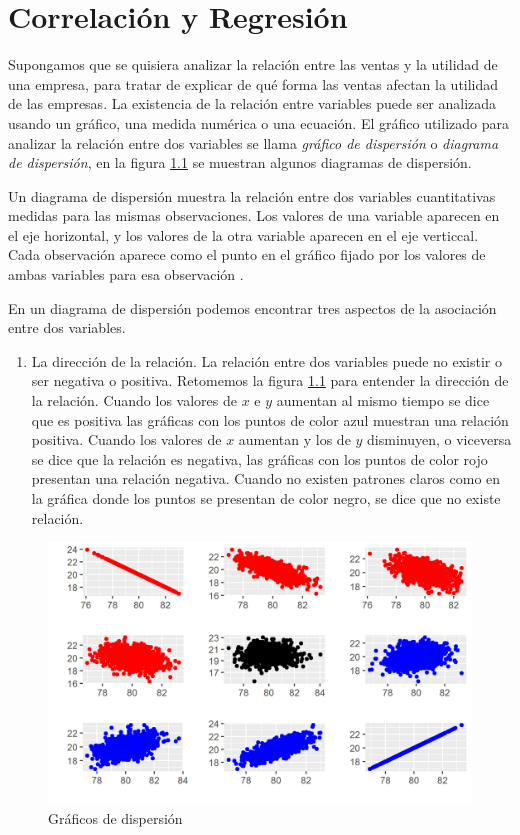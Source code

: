 \documentclass[letterpaper,]{book}
\providecommand{\tightlist}{%
  \setlength{\itemsep}{0pt}\setlength{\parskip}{0pt}}
\begin{document}
\hypertarget{methods}{%
\chapter{Correlación y Regresión}\label{methods}}

Supongamos que se quisiera analizar la relación entre las ventas y la utilidad de una empresa, para tratar de explicar de qué forma las ventas afectan la utilidad de las empresas. La existencia de la relación entre variables puede ser analizada usando un gráfico, una medida numérica o una ecuación.
El gráfico utilizado para analizar la relación entre dos variables se llama \emph{gráfico de dispersión} o \emph{diagrama de dispersión}, en la figura \ref{fig:corr} se muestran algunos diagramas de dispersión.

Un diagrama de dispersión muestra la relación entre dos variables cuantitativas medidas para las mismas observaciones. Los valores de una variable aparecen en el eje horizontal, y los valores de la otra variable aparecen en el eje verticcal. Cada observación aparece como el punto en el gráfico fijado por los valores de ambas variables para esa observación .

En un diagrama de dispersión podemos encontrar tres aspectos de la asociación entre dos variables.

\begin{enumerate}
\def\labelenumi{\arabic{enumi}.}
\tightlist
\item
  La dirección de la relación. La relación entre dos variables puede no existir o ser negativa o positiva. Retomemos la figura \ref{fig:corr} para entender la dirección de la relación. Cuando los valores de \(x\) e \(y\) aumentan al mismo tiempo se dice que es positiva las gráficas con los puntos de color azul muestran una relación positiva. Cuando los valores de \(x\) aumentan y los de \(y\) disminuyen, o viceversa se dice que la relación es negativa, las gráficas con los puntos de color rojo presentan una relación negativa. Cuando no existen patrones claros como en la gráfica donde los puntos se presentan de color negro, se dice que no existe relación.
\end{enumerate}

\begin{figure}[!h]

{\centering \includegraphics[width=0.5\linewidth]{corr} 

}

\caption{Gráficos de dispersión}\label{fig:corr}
\end{figure}
\end{document}

